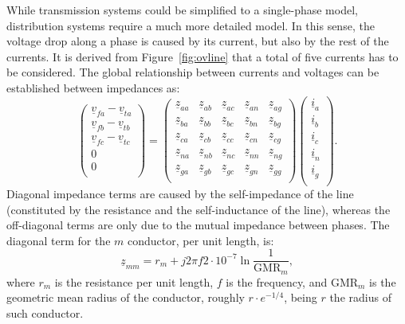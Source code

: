 \documentclass[11pt]{article}
\begin{document}
	While transmission systems could be simplified to a single-phase model, distribution systems require a much more detailed model. In this sense, the voltage drop along a phase is caused by its current, but also by the rest of the currents. It is derived from Figure~\ref{fig:ovline} that a total of five currents has to be considered. The global relationship between currents and voltages can be established between impedances as:
	\begin{equation}
		\begin{pmatrix}
			\underline{v}_{fa} - \underline{v}_{ta} \\
			\underline{v}_{fb} - \underline{v}_{tb} \\
			\underline{v}_{fc} - \underline{v}_{tc} \\
			0 \\
			0 \\
		\end{pmatrix}
	= \begin{pmatrix}
		\underline{z}_{aa} & \underline{z}_{ab} & \underline{z}_{ac} & \underline{z}_{an} & \underline{z}_{ag} \\
		\underline{z}_{ba} & \underline{z}_{bb} & \underline{z}_{bc} & \underline{z}_{bn} & \underline{z}_{bg} \\
		\underline{z}_{ca} & \underline{z}_{cb} & \underline{z}_{cc} & \underline{z}_{cn} & \underline{z}_{cg} \\
		\underline{z}_{na} & \underline{z}_{nb} & \underline{z}_{nc} & \underline{z}_{nn} & \underline{z}_{ng} \\
		\underline{z}_{ga} & \underline{z}_{gb} & \underline{z}_{gc} & \underline{z}_{gn} & \underline{z}_{gg} \\
	\end{pmatrix}
	\begin{pmatrix}
		\underline{i}_{a} \\
		\underline{i}_{b} \\
		\underline{i}_{c} \\
		\underline{i}_{n} \\
		\underline{i}_{g} \\
	\end{pmatrix}.
	\label{eq:comp1}
	\end{equation}
	Diagonal impedance terms are caused by the self-impedance of the line (constituted by the resistance and the self-inductance of the line), whereas the off-diagonal terms are only due to the mutual impedance between phases. The diagonal term for the $m$ conductor, per unit length, is:
	\begin{equation}
			\underline{z}_{mm} = r_m + j 2\pi f 2\cdot 10^{-7} \ln \frac{1}{\text{GMR}_m}, 
	\end{equation}
	where $r_m$ is the resistance per unit length, $f$ is the frequency, and $\text{GMR}_m$ is the geometric mean radius of the conductor, roughly $r\cdot e^{-1/4}$, being $r$ the radius of such conductor. 
	
\end{document}
